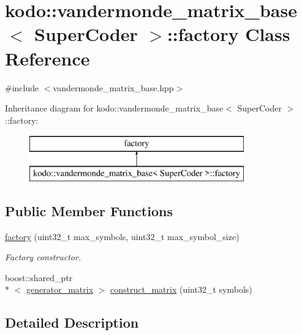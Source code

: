 \hypertarget{classkodo_1_1vandermonde__matrix__base_1_1factory}{\section{kodo\-:\-:vandermonde\-\_\-matrix\-\_\-base$<$ Super\-Coder $>$\-:\-:factory Class Reference}
\label{classkodo_1_1vandermonde__matrix__base_1_1factory}
}


{\ttfamily \#include $<$vandermonde\-\_\-matrix\-\_\-base.\-hpp$>$}

Inheritance diagram for kodo\-:\-:vandermonde\-\_\-matrix\-\_\-base$<$ Super\-Coder $>$\-:\-:factory\-:\begin{figure}[H]
\begin{center}
\leavevmode
\includegraphics[height=2.000000cm]{classkodo_1_1vandermonde__matrix__base_1_1factory}
\end{center}
\end{figure}
\subsection*{Public Member Functions}
\begin{DoxyCompactItemize}
\item 
\hyperlink{classkodo_1_1vandermonde__matrix__base_1_1factory_aef99dedec0d6884811560a3e1ca455f6}{factory} (uint32\-\_\-t max\-\_\-symbols, uint32\-\_\-t max\-\_\-symbol\-\_\-size)
\begin{DoxyCompactList}\small\item\em Factory constructor. \end{DoxyCompactList}\item 
boost\-::shared\-\_\-ptr\\*
$<$ \hyperlink{classkodo_1_1vandermonde__matrix__base_ad6151129e0883cfa9052748a4f89cf3c}{generator\-\_\-matrix} $>$ \hyperlink{classkodo_1_1vandermonde__matrix__base_1_1factory_afcf0228b29d44eaa0c6cd39def5d25ee}{construct\-\_\-matrix} (uint32\-\_\-t symbols)
\end{DoxyCompactItemize}


\subsection{Detailed Description}
